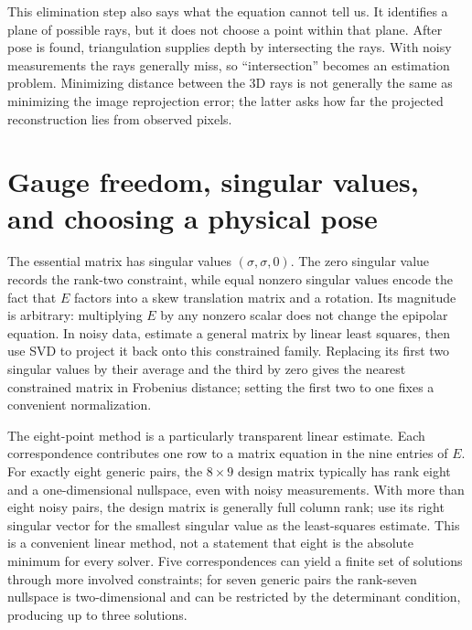 This elimination step also says what the equation cannot tell us. It identifies a plane of possible rays, but it does not choose a point within that plane. After pose is found, triangulation supplies depth by intersecting the rays. With noisy measurements the rays generally miss, so ``intersection'' becomes an estimation problem. Minimizing distance between the 3D rays is not generally the same as minimizing the image reprojection error; the latter asks how far the projected reconstruction lies from observed pixels.

\section{Gauge freedom, singular values, and choosing a physical pose}\label{02-foundations-ii-ch036-gauge-freedom-singular-values-and-choosing-a-physical-pose}

\hypertarget{02-foundations-ii-ch036-gauge-freedom-singular-values-and-choosing-a-physical-pose}{}

The essential matrix has singular values \((\sigma,\sigma,0)\). The zero singular value records the rank-two constraint, while equal nonzero singular values encode the fact that \(E\) factors into a skew translation matrix and a rotation. Its magnitude is arbitrary: multiplying \(E\) by any nonzero scalar does not change the epipolar equation. In noisy data, estimate a general matrix by linear least squares, then use SVD to project it back onto this constrained family. Replacing its first two singular values by their average and the third by zero gives the nearest constrained matrix in Frobenius distance; setting the first two to one fixes a convenient normalization.

The eight-point method is a particularly transparent linear estimate. Each correspondence contributes one row to a matrix equation in the nine entries of \(E\). For exactly eight generic pairs, the \(8\times9\) design matrix typically has rank eight and a one-dimensional nullspace, even with noisy measurements. With more than eight noisy pairs, the design matrix is generally full column rank; use its right singular vector for the smallest singular value as the least-squares estimate. This is a convenient linear method, not a statement that eight is the absolute minimum for every solver. Five correspondences can yield a finite set of solutions through more involved constraints; for seven generic pairs the rank-seven nullspace is two-dimensional and can be restricted by the determinant condition, producing up to three solutions.

